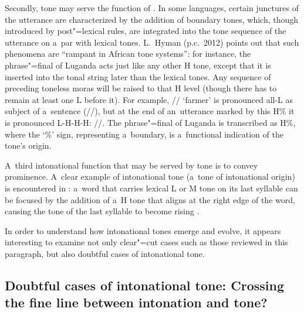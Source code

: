 Secondly, tone may serve the function of . In some languages, certain junctures of the utterance are
characterized by the addition of boundary tones, which, though introduced by post"=lexical rules, are
integrated into the tone sequence of the utterance on a~par with lexical tones. L.\ Hyman (p.c.\ 2012) points out that such phenomena are “rampant in African tone systems”: for instance, the phrase"=final  of Luganda acts just like any other H tone, except that it is inserted into the tonal string later than the lexical tones. Any
sequence of preceding toneless moras will be raised to that H level (though there has to remain at
least one L before it). For example, // ‘farmer’ is pronounced all-L as subject of a~sentence
(//), but at the end of an~utterance marked by this H\% it is pronounced L-H-H-H: //. The phrase"=final  of Luganda is transcribed as H\%, where the ‘\%’ sign,
representing a~boundary, is a~functional indication of the tone’s origin.

A~third intonational function that may be served by tone is to convey prominence. A~clear example of
intonational tone (a~tone of intonational origin) is encountered in : a~word that carries
lexical L or M tone on its last syllable can be focused by the addition of a~H tone that aligns at the
right edge of the word, causing the tone of the last syllable to become rising
\citep[72]{michaud2006d}.

In order to understand how intonational tones emerge and evolve, it appears interesting to examine
not only clear"=cut cases such as those reviewed in this paragraph, but also doubtful cases of
intonational tone.


\subsection{Doubtful cases of intonational tone: Crossing the fine line between intonation and tone?}
\label{sec:doubtfulcasesofintonationaltonescrossingthefinelinebetweenintonationandtone}


